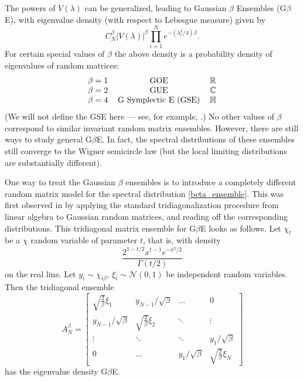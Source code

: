 \documentclass[letterpaper,11pt,oneside,reqno]{amsart}
\numberwithin{equation}{section}
\theoremstyle{definition}
\begin{document}
The powers of $V(\lambda)$ can be generalized, leading to Gaussian $\beta$ Ensembles (G$\beta$E), 
with eigenvalue density (with respect to Lebesgue measure) given by
\begin{equation}\label{beta_ensemble}
  C_N^{\beta} |V(\lambda)|^{\beta} \prod_{i=1}^N e^{-(\lambda_i^2/4)\beta}.
\end{equation}
For certain special values of $\beta$ the above density
is a probability density of eigenvalues of random matrices:
\begin{equation*}
	\begin{tabular}{ccc}
	  $\beta=1$ & GOE & $\mathbb{R}$ \\
	  $\beta=2$ & GUE & $\mathbb{C}$ \\
	  $\beta=4$ & G Symplectic E (GSE) & $\mathbb{H}$
	\end{tabular}
\end{equation*}
(We will not define the GSE here --- see, for example, \cite{mehta2004random}.)
No other values of $\beta$ correspond to similar invariant random matrix ensembles. 
However, there are still ways to study general G$\beta$E. In fact, the spectral distributions
of these ensembles still converge to the Wigner semicircle law (but the local limiting distributions
are substantially different).

One way to treat the Gaussian $\beta$ ensembles is to introduce a completely different
random matrix model for the spectral distribution \eqref{beta_ensemble}.
This was first observed in 
\cite{dumitriu2002matrix} by applying the standard tridiagonalization procedure from
linear algebra to Gaussian random matrices, and reading off the corresponding distributions.
This tridiagonal matrix ensemble for G$\beta$E looks as follows. 
Let $\chi_t$ be a $\chi$ random variable of parameter $t$, that is, with density 
\begin{equation*}
  \frac{2^{1-t/2} x^{t-1} e^{-x^2/2}}{\Gamma(t/2)}
\end{equation*}
on the real line.
Let $y_i \sim \chi_{i\beta}$, $\xi_i\sim \mathcal{N}(0,1)$ be independent random variables. Then the tridiagonal ensemble 
\begin{equation*}
  A_N^\beta=\begin{bmatrix}
    \sqrt{\frac{2}{\beta}}\xi_1 & y_{N-1}/\sqrt{\beta} &  \dots & 0 \\
    y_{N-1}/\sqrt{\beta} & \sqrt{\frac{2}{\beta}}\xi_2 & \ddots &  \vdots \\
    \vdots & \ddots & \ddots &   y_{1}/\sqrt{\beta} \\
    0 & \dots & y_{1}/\sqrt{\beta} & \sqrt{\frac{2}{\beta}} \xi_N 
  \end{bmatrix}
\end{equation*}
has the eigenvalue density G$\beta$E.
\end{document}
